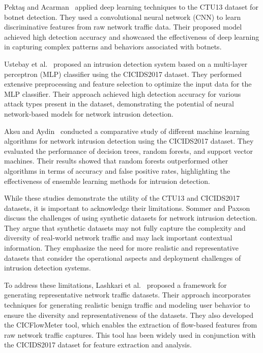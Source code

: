 Pektaş and Acarman~\cite{pektacs2019deep} applied deep learning techniques to the CTU13 dataset for botnet detection. They used a convolutional neural network (CNN) to learn discriminative features from raw network traffic data. Their proposed model achieved high detection accuracy and showcased the effectiveness of deep learning in capturing complex patterns and behaviors associated with botnets.

Ustebay et al.~\cite{ustebay2018intrusion} proposed an intrusion detection system based on a multi-layer perceptron (MLP) classifier using the CICIDS2017 dataset. They performed extensive preprocessing and feature selection to optimize the input data for the MLP classifier. Their approach achieved high detection accuracy for various attack types present in the dataset, demonstrating the potential of neural network-based models for network intrusion detection.

Aksu and Aydin~\cite{aksu2018detecting} conducted a comparative study of different machine learning algorithms for network intrusion detection using the CICIDS2017 dataset. They evaluated the performance of decision trees, random forests, and support vector machines. Their results showed that random forests outperformed other algorithms in terms of accuracy and false positive rates, highlighting the effectiveness of ensemble learning methods for intrusion detection.

While these studies demonstrate the utility of the CTU13 and CICIDS2017 datasets, it is important to acknowledge their limitations. Sommer and Paxson~\cite{sommer2010outside} discuss the challenges of using synthetic datasets for network intrusion detection. They argue that synthetic datasets may not fully capture the complexity and diversity of real-world network traffic and may lack important contextual information. They emphasize the need for more realistic and representative datasets that consider the operational aspects and deployment challenges of intrusion detection systems.

To address these limitations, Lashkari et al.~\cite{lashkari2017characterization} proposed a framework for generating representative network traffic datasets. Their approach incorporates techniques for generating realistic benign traffic and modeling user behavior to ensure the diversity and representativeness of the datasets. They also developed the CICFlowMeter tool, which enables the extraction of flow-based features from raw network traffic captures. This tool has been widely used in conjunction with the CICIDS2017 dataset for feature extraction and analysis.

